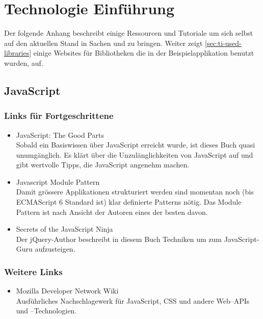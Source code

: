 \chapter{Technologie Einführung}

Der folgende Anhang beschreibt einige Ressourcen und Tutoriale um sich selbst
auf den aktuellen Stand in Sachen  und  zu bringen.
Weiter zeigt \ref{sec:ti-used-libraries} einige Websites für Bibliotheken die in der
Beispielapplikation benutzt wurden, auf.

\section{JavaScript}
\label{sec:ti-javascript}

\subsection*{Links für Fortgeschrittene}
\begin{itemize}
	\item JavaScript: The Good Parts \cite{Crockford:2008:JGP:1386753} \\
		Sobald ein Basiswissen über JavaScript erreicht wurde, ist dieses Buch
		quasi unumgänglich. Es klärt über die Unzulänglichkeiten von JavaScript
		auf und gibt wertvolle Tipps, die JavaScript angenehm machen.
	\item Javascript Module Pattern \cite{JSModulePattern} \\
		Damit grössere Applikationen strukturiert werden sind momentan noch (bis ECMAScript 6 Standard ist) klar definierte Patterns nötig.
		Das Module Pattern ist nach Ansicht der Autoren eines der besten davon.
	\item Secrets of the JavaScript Ninja \cite{resig2012secrets} \\
		Der jQuery-Author beschreibt in diesem Buch Techniken um zum
		JavaScript-Guru aufzusteigen.
\end{itemize}

\subsection*{Weitere Links}
\begin{itemize}
	\item Mozilla Developer Network Wiki \cite{MDN} \\
		Ausführliches Nachschlagewerk für JavaScript, CSS und
		andere Web--APIs und --Technologien.
\end{itemize}

